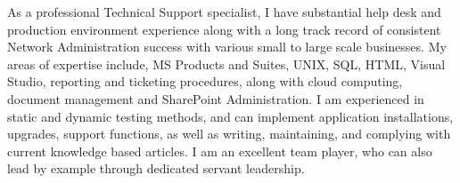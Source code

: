 As a professional Technical Support specialist, I have substantial help desk and production environment experience along with a long track record of consistent Network Administration success with various small to large scale businesses. My areas of expertise include, MS Products and Suites, UNIX, SQL, HTML, Visual Studio, reporting and ticketing procedures, along with cloud computing, document management and SharePoint Administration. I am experienced in static and dynamic testing methods, and can implement application installations, upgrades, support functions, as well as writing, maintaining, and complying with current knowledge based articles. I am an excellent team player, who can also lead by example through dedicated servant leadership.
